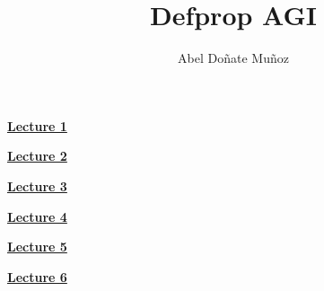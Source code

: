 \documentclass[9pt,leqno,landscape,twocolumn]{extarticle}
\title{Defprop AGI}
\author{Abel Doñate Muñoz}
\date{}
\begin{document}

\textbf{\underline{Lecture 1}}



\textbf{\underline{Lecture 2}}



\textbf{\underline{Lecture 3}}



\textbf{\underline{Lecture 4}}



\textbf{\underline{Lecture 5}}



\textbf{\underline{Lecture 6}}


\end{document}

